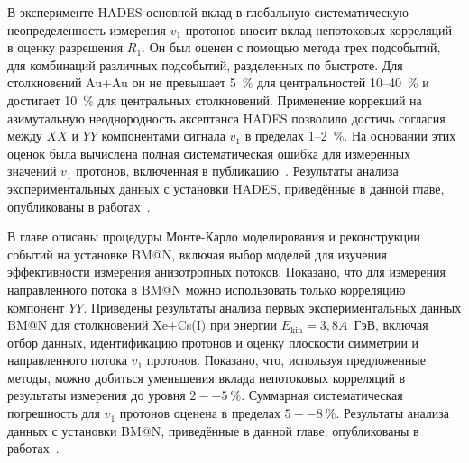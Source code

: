 В эксперименте HADES основной вклад в глобальную систематическую неопределенность измерения $v_1$ протонов 
вносит вклад непотоковых корреляций в  оценку разрешения  $R_1$. Он был оценен с 
 помощью метода трех подсобытий,  для комбинаций различных подсобытий, разделенных по быстроте.
Для столкновений Au+Au он не превышает 5~\% для центральностей 10--40~\%  и достигает 10~\% для центральных столкновений. 
Применение коррекций на азимутальную неоднородность аксептанса HADES позволило достичь согласия между $XX$ и $YY$ компонентами 
сигнала $v_1$ в пределах 1--2~\%. 
На основании этих оценок была вычислена полная систематическая ошибка для измеренных значений $v_1$ протонов, включенная в публикацию~\cite{HADES:2020lob}.
Результаты анализа экспериментальных данных с установки HADES, приведённые в данной главе, опубликованы в работах~\cite{Mamaev:2020qom,HADES:2020lob,Mamaev:2020lpi}.

В главе описаны процедуры Монте-Карло моделирования и реконструкции событий на установке BM@N, включая выбор моделей для изучения эффективности измерения анизотропных потоков. 
Показано, что для измерения направленного потока в  BM@N можно  использовать только корреляцию компонент $YY$. 
Приведены результаты анализа первых экспериментальных данных BM@N для столкновений Xe+Cs(I) при энергии $E_{\text{kin}} = 3,8A$~ГэВ, включая отбор данных, идентификацию протонов и оценку плоскости симметрии и направленного потока $v_1$  протонов.
Показано, что, используя предложенные  методы, можно добиться уменьшения  вклада непотоковых корреляций в результаты измерения до уровня  $2--5~\%$.
Суммарная систематическая погрешность для  $v_1$ протонов оценена в пределах $5--8~\%$.
Результаты анализа данных с установки BM@N, приведённые в данной главе, 
опубликованы в работах~\cite{Mamaev:2024,Mamaev:2023yhz,Mamaev:2023fpr,doi:10.1142/S021830132441009X}.